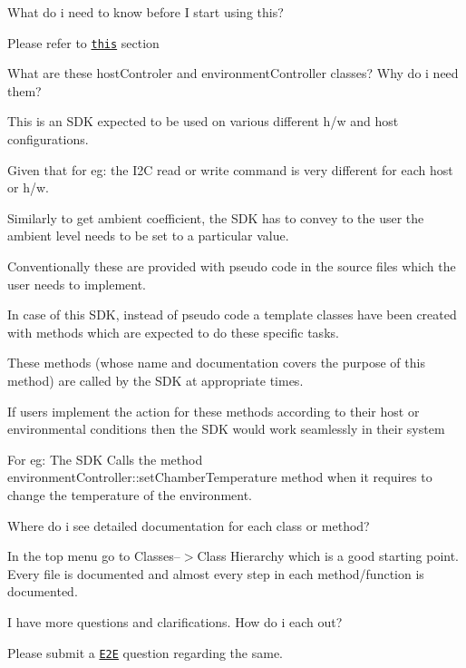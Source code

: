 \begin{DoxyEnumerate}
\begin{DoxyItemize}
\end{DoxyItemize}
\item What do i need to know before I start using this?
\begin{DoxyItemize}
\item Please refer to \href{#Prereq}{\tt this} section
\end{DoxyItemize}
\item What are these host\+Controler and environment\+Controller classes? Why do i need them?
\begin{DoxyItemize}
\item This is an S\+DK expected to be used on various different h/w and host configurations.
\item Given that for eg\+: the I2C read or write command is very different for each host or h/w.
\item Similarly to get ambient coefficient, the S\+DK has to convey to the user the ambient level needs to be set to a particular value.
\item Conventionally these are provided with pseudo code in the source files which the user needs to implement.
\item In case of this S\+DK, instead of pseudo code a template classes have been created with methods which are expected to do these specific tasks.
\item These methods (whose name and documentation covers the purpose of this method) are called by the S\+DK at appropriate times.
\item If users implement the action for these methods according to their host or environmental conditions then the S\+DK would work seamlessly in their system
\item For eg\+: The S\+DK Calls the method environment\+Controller\+::set\+Chamber\+Temperature method when it requires to change the temperature of the environment.
\end{DoxyItemize}
\item Where do i see detailed documentation for each class or method?
\begin{DoxyItemize}
\item In the top menu go to Classes--$>$Class Hierarchy which is a good starting point. Every file is documented and almost every step in each method/function is documented.
\end{DoxyItemize}
\item I have more questions and clarifications. How do i each out?
\begin{DoxyItemize}
\item Please submit a \href{http://e2e.ti.com}{\tt E2E} question regarding the same. 
\end{DoxyItemize}
\end{DoxyEnumerate}